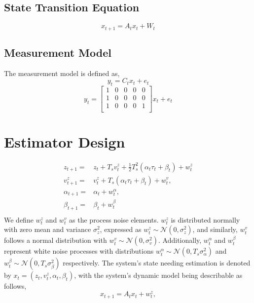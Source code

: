 \documentclass{article}
\begin{document}
\subsection{State Transition Equation}
\begin{equation}
    {x}_{t+1} = A_t {x}_t + W_t
\end{equation}

\subsection{Measurement Model}
The measurement model is defined as,
\begin{equation}
y_t = C_t x_t + e_t
\end{equation}
\begin{equation}
    y_t  = 
    \begin{bmatrix}
        1 & 0 & 0 & 0 & 0 \\
        1 & 0 & 0 & 0 & 0 \\
        1 & 0 & 0 & 0 & 1 \\
    \end{bmatrix}
        x_t + e_t
\end{equation}

\section{Estimator Design}
\begin{align}
    z_{t+1} =& z_t + T_s v_t^z + \frac{1}{2} T_s^2 (\alpha_t \tau_t + \beta_t) + w_t^z\\
    v_{t+1}^z =& v_t^z + T_s (\alpha_t \tau_t + \beta_t) + w_t^v,\\
    \alpha_{t+1} =& \alpha_t + w_t^\alpha,\\
    \beta_{t+1} =& \beta_t + w_t^\beta\\
\end{align}
\noindent
We define $w_t^z$ and $w_t^v$ as the process noise elements.
$w_t^z$ is distributed normally with zero mean and variance
$\sigma_z^2$, expressed as $w_t^z \sim \mathcal{N}(0, \sigma_z^2)$, 
and similarly, $w_t^v$ follows a normal distribution with $w_t^v \sim \mathcal{N}(0, \sigma_v^2)$.
Additionally, $w_t^\alpha$ and $w_t^\beta$ represent white noise processes with distributions
$w_t^\alpha \sim \mathcal{N}(0, T_s \sigma_\alpha^2)$ and $w_t^\beta \sim \mathcal{N}(0, T_s \sigma_\beta^2)$ 
respectively. The system's state needing estimation is denoted by $x_t = (z_t, v_t^z, \alpha_t, \beta_t)$, 
with the system's dynamic model being describable as follows,
\begin{equation}
    x_{t+1} = A_t x_t + w_t^z,
\end{equation}
\end{document}
